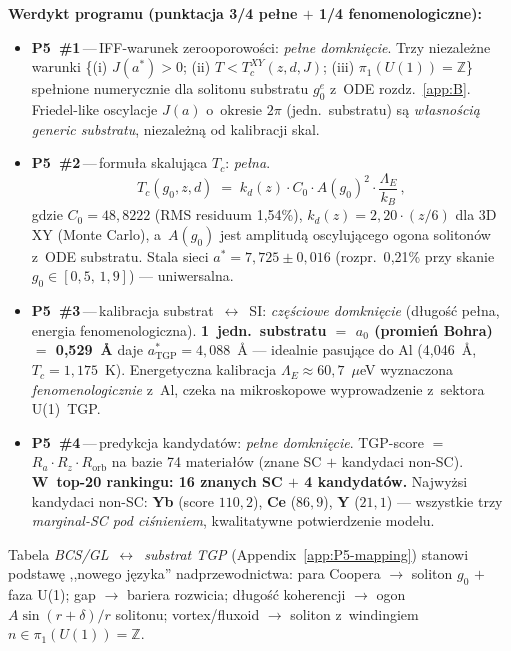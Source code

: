 \medskip\noindent\textbf{Werdykt programu (punktacja 3/4 pe\l{}ne $+$ 1/4 fenomenologiczne):}
\begin{itemize}\itemsep0pt
  \item \textbf{P5~\#1}\,---\,IFF-warunek zerooporowo\'sci: \emph{pe\l{}ne domkni\k{e}cie}.
    Trzy niezale\.zne warunki \{(i) $J(a^*)>0$; (ii) $T<T_c^{XY}(z,d,J)$;
    (iii) $\pi_1(U(1))=\mathbb{Z}$\} spe\l{}nione numerycznie dla solitonu
    substratu $g_0^e$ z~ODE rozdz.~\ref{app:B}. Friedel-like oscylacje
    $J(a)$ o~okresie $2\pi$ (jedn.~substratu) s\k{a} \emph{w\l{}asno\'sci\k{a}
    generic substratu}, niezale\.zn\k{a} od kalibracji skal.
  \item \textbf{P5~\#2}\,---\,formu\l{}a skaluj\k{a}ca $T_c$: \emph{pe\l{}na}.
    \[
      \boxed{\quad T_c(g_0, z, d)
      \;=\;
      k_d(z)\cdot C_0 \cdot A(g_0)^2 \cdot \frac{\Lambda_E}{k_B}\,,
      \quad}
    \]
    gdzie $C_0 = 48{,}8222$ (RMS residuum 1{,}54\%),
    $k_d(z) = 2{,}20\cdot (z/6)$ dla 3D XY (Monte Carlo),
    a~$A(g_0)$ jest amplitud\k{a} oscyluj\k{a}cego ogona soliton\'ow
    z~ODE substratu. Stala sieci $a^* = 7{,}725 \pm 0{,}016$
    (rozpr.~0{,}21\% przy skanie $g_0 \in [0{,}5,\,1{,}9]$) --- uniwersalna.
  \item \textbf{P5~\#3}\,---\,kalibracja substrat~$\leftrightarrow$~SI:
    \emph{cz\k{e}\'sciowe domkni\k{e}cie} (d\l{}ugo\'s\'c pe\l{}na, energia fenomenologiczna).
    \textbf{1~jedn.~substratu $=$ $a_0$ (promie\'n Bohra) $=$ 0{,}529~\AA}
    daje $a^*_\text{TGP} = 4{,}088$~\AA{} --- idealnie pasuj\k{a}ce do Al
    (4{,}046~\AA, $T_c = 1{,}175$~K). Energetyczna kalibracja
    $\Lambda_E \approx 60{,}7$~$\mu$eV wyznaczona \emph{fenomenologicznie}
    z~Al, czeka na mikroskopowe wyprowadzenie z~sektora U(1)~TGP.
  \item \textbf{P5~\#4}\,---\,predykcja kandydat\'ow: \emph{pe\l{}ne domkni\k{e}cie}.
    TGP-score $=$ $R_a\cdot R_z\cdot R_\text{orb}$ na bazie 74 materia\l{}\'ow
    (znane SC $+$ kandydaci non-SC). \textbf{W~top-20 rankingu: 16 znanych SC $+$ 4 kandydat\'ow.}
    Najwy\.zsi kandydaci non-SC: \textbf{Yb} (score $110{,}2$),
    \textbf{Ce} ($86{,}9$), \textbf{Y} ($21{,}1$)
    --- wszystkie trzy \emph{marginal-SC pod ci\'snieniem},
    kwalitatywne potwierdzenie modelu.
\end{itemize}

\medskip\noindent
Tabela \emph{BCS/GL}~$\leftrightarrow$~\emph{substrat TGP} (Appendix~\ref{app:P5-mapping})
stanowi podstaw\k{e} ,,nowego j\k{e}zyka'' nadprzewodnictwa:
para Coopera $\to$ soliton $g_0$ $+$ faza U(1); gap $\to$ bariera rozwicia;
d\l{}ugo\'s\'c koherencji $\to$ ogon $A\sin(r+\delta)/r$ solitonu;
vortex/fluxoid $\to$ soliton z~windingiem $n\in\pi_1(U(1))=\mathbb{Z}$.

